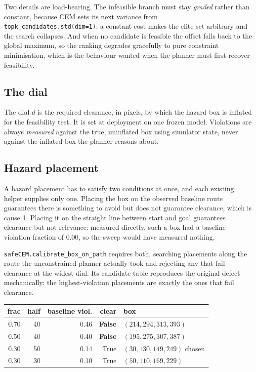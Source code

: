 \documentclass[11pt,a4paper]{article}
\newcommand{\dial}{\ensuremath{d}}
\begin{document}
Two details are load-bearing. The infeasible branch must stay \emph{graded} rather than
constant, because CEM sets its next variance from \texttt{topk\_candidates.std(dim=1)}: a
constant cost makes the elite set arbitrary and the search collapses. And when no candidate is
feasible the offset falls back to the global maximum, so the ranking degrades gracefully to
pure constraint minimisation, which is the behaviour wanted when the planner must first
recover feasibility.

\subsection{The dial}

The dial $\dial$ is the required clearance, in pixels, by which the hazard box is inflated for
the feasibility test. It is set at deployment on one frozen model. Violations are always
\emph{measured} against the true, uninflated box using simulator state, never against the
inflated box the planner reasons about.

\subsection{Hazard placement}

A hazard placement has to satisfy two conditions at once, and each existing helper supplies
only one. Placing the box on the observed baseline route guarantees there is something to
avoid but does not guarantee clearance, which is cause 1. Placing it on the straight line
between start and goal guarantees clearance but not relevance: measured directly, such a box
had a baseline violation fraction of $0.00$, so the sweep would have measured nothing.

\texttt{safeCEM.calibrate\_box\_on\_path} requires both, searching placements along the route
the unconstrained planner actually took and rejecting any that fail clearance at the widest
dial. Its candidate table reproduces the original defect mechanically: the highest-violation
placements are exactly the ones that fail clearance.

\begin{center}
\footnotesize
\begin{tabular}{rrrrl}
\toprule
frac & half & baseline viol. & clear & box \\
\midrule
0.70 & 40 & 0.46 & \textbf{False} & $(214, 294, 313, 393)$ \\
0.50 & 40 & 0.40 & \textbf{False} & $(195, 275, 307, 387)$ \\
0.30 & 50 & 0.14 & True  & $(30, 130, 149, 249)$ \quad chosen \\
0.30 & 30 & 0.10 & True  & $(50, 110, 169, 229)$ \\
\bottomrule
\end{tabular}
\end{center}
\end{document}
